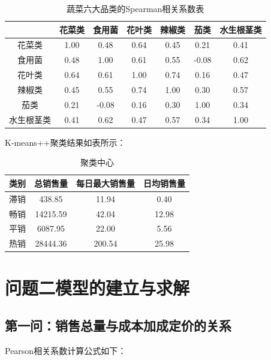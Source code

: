 \documentclass[a4paper,12pt]{article}
\begin{document}
	\begin{table}[H]
		\centering
		\caption{蔬菜六大品类的Spearman相关系数表}
		\begin{tabular}{c|c|c|c|c|c|c}
			\hline
			& \textbf{花菜类} & \textbf{食用菌} & \textbf{花叶类} & \textbf{辣椒类} & \textbf{茄类} & \textbf{水生根茎类} \\
			\hline
			花菜类 & 1.00 & 0.48 & 0.64 & 0.45 & 0.21 & 0.41 \\
			食用菌 & 0.48 & 1.00 & 0.61 & 0.55 & -0.08 & 0.62 \\
			花叶类 & 0.64 & 0.61 & 1.00 & 0.74 & 0.16 & 0.47 \\
			辣椒类 & 0.45 & 0.55 & 0.74 & 1.00 & 0.30 & 0.57 \\
			茄类 & 0.21 & -0.08 & 0.16 & 0.30 & 1.00 & 0.34 \\
			水生根茎类 & 0.41 & 0.62 & 0.47 & 0.57 & 0.34 & 1.00 \\
			\hline
		\end{tabular}
	\end{table}
	
	K-means++聚类结果如表所示：
	
	\begin{table}[H]
		\centering
		\caption{聚类中心}
		\begin{tabular}{c|c|c|c}
			\hline
			\textbf{类别} & \textbf{总销售量} & \textbf{每日最大销售量} & \textbf{日均销售量} \\
			\hline
			滞销 & 438.85 & 11.94 & 0.40 \\
			畅销 & 14215.59 & 42.04 & 12.98 \\
			平销 & 6087.95 & 22.00 & 5.56 \\
			热销 & 28444.36 & 200.54 & 25.98 \\
			\hline
		\end{tabular}
	\end{table}
	
	\newpage
	
	\section{问题二模型的建立与求解}
	
	\subsection{第一问：销售总量与成本加成定价的关系}
	
	Pearson相关系数计算公式如下：
	
\end{document}
